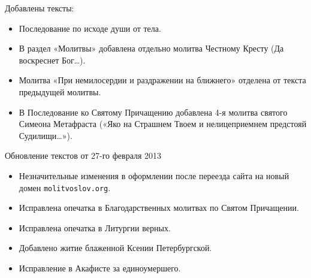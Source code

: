 Добавлены тексты:

\begin{itemize}

\item Последование по исходе души от тела.
\item В раздел «Молитвы» добавлена отдельно молитва Честному Кресту (Да воскреснет Бог\ldots).
\item Молитва «При немилосердии и раздражении на ближнего» отделена от текста предыдущей молитвы.
\item В Последование ко Святому Причащению добавлена 4-я молитва святого Симеона Метафраста («Яко на Страшнем Твоем и нелицеприемнем предстояй Судилищи\ldots»).

\end{itemize}


Обновление текстов от 27-го февраля 2013

\begin{itemize}

\item Незначительные изменения в оформлении после переезда сайта на новый домен \texttt{molitvoslov.org}.
\item Исправлена опечатка в Благодарственных молитвах по Святом Причащении.
\item Исправлена опечатка в Литургии верных.
\item Добавлено житие блаженной Ксении Петербургской.
\item Исправление в Акафисте за единоумершего.

\end{itemize}


